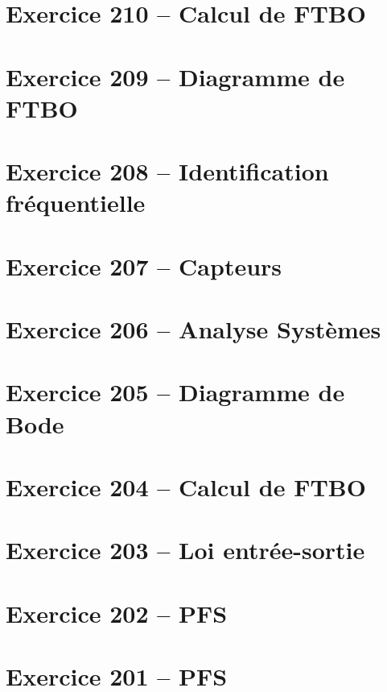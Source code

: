 \documentclass[10pt,fleqn]{article} %
\begin{document}
\begin{multicols}{2}
\section*{Exercice 210 -- Calcul de FTBO}
\renewcommand{\repex}{007_FTBO}
\graphicspath{{\repex/images/}}


\section*{Exercice 209 -- Diagramme de FTBO}
\renewcommand{\repex}{008_Bode}
\graphicspath{{\repex/images/}}


\section*{Exercice 208 -- Identification fréquentielle}
\renewcommand{\repex}{009_IdentificationBode}
\graphicspath{{\repex/images/}}


\section*{Exercice 207 -- Capteurs}
\renewcommand{\repex}{010_Capteurs}
\graphicspath{{\repex/images/}}


\section*{Exercice 206 -- Analyse Systèmes}
\renewcommand{\repex}{011_IS}
\graphicspath{{\repex/images/}}


\section*{Exercice 205 -- Diagramme de Bode}
\renewcommand{\repex}{012_Bode}
\graphicspath{{\repex/images/}}


\section*{Exercice 204 -- Calcul de FTBO}
\renewcommand{\repex}{013_FTBO}
\graphicspath{{\repex/images/}}


\section*{Exercice 203 -- Loi entrée-sortie}
\renewcommand{\repex}{014_LoiES}
\graphicspath{{\repex/images/}}


\section*{Exercice 202 -- PFS}
\renewcommand{\repex}{015_PFS}
\graphicspath{{\repex/images/}}


\section*{Exercice 201 -- PFS}
\renewcommand{\repex}{016_PFS}
\graphicspath{{\repex/images/}}



\end{multicols}
\end{document}
